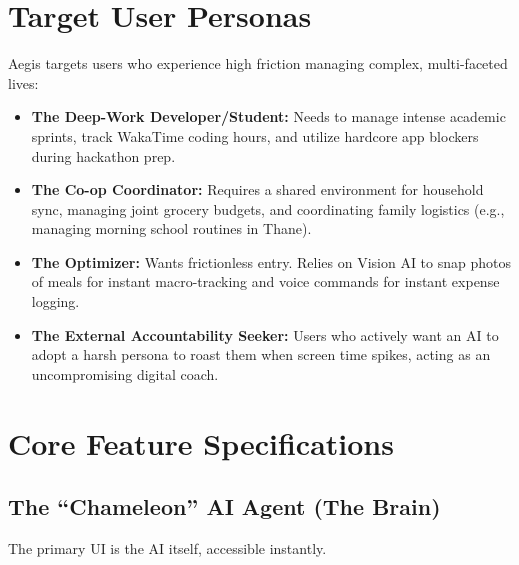 \documentclass[11pt,oneside]{article}
\begin{document}
\section{Target User Personas}

Aegis targets users who experience high friction managing complex, multi-faceted lives:

\begin{itemize}
  \item \textbf{The Deep-Work Developer/Student:} Needs to manage intense academic sprints, track WakaTime coding hours, and utilize hardcore app blockers during hackathon prep.
  
  \item \textbf{The Co-op Coordinator:} Requires a shared environment for household sync, managing joint grocery budgets, and coordinating family logistics (e.g., managing morning school routines in Thane).
  
  \item \textbf{The Optimizer:} Wants frictionless entry. Relies on Vision AI to snap photos of meals for instant macro-tracking and voice commands for instant expense logging.
  
  \item \textbf{The External Accountability Seeker:} Users who actively want an AI to adopt a harsh persona to roast them when screen time spikes, acting as an uncompromising digital coach.
\end{itemize}

\section{Core Feature Specifications}

\subsection{The ``Chameleon'' AI Agent (The Brain)}

The primary UI is the AI itself, accessible instantly.
\end{document}
